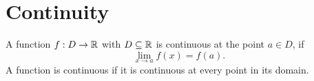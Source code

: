 \chapter{Continuity}

\begin{definition}[Continuity]
  A function $f: D \to \mathbb{R}$ with $D \subseteq \mathbb{R}$ is continuous at the point $a \in D$, if
  \[
    \lim_{x \to a} f(x) = f(a).
  \]
  A function is continuous if it is continuous at every point in its domain.
\end{definition}